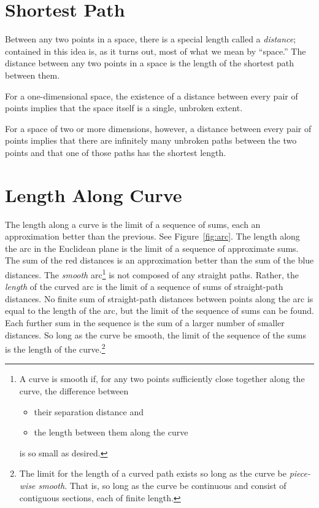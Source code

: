 \section{Shortest Path}

Between any two points in a space, there is a special length called a
\emph{distance}; contained in this idea is, as it turns out, most of what we
mean by ``space.'' The distance between any two points in a space is the length
of the shortest path between them.

For a one-dimensional space, the existence of a distance between every pair of
points implies that the space itself is a single, unbroken extent.

For a space of two or more dimensions, however, a distance between every pair
of points implies that there are infinitely many unbroken paths between the two
points and that one of those paths has the shortest length.

\section{Length Along Curve}

The length along a curve is the limit of a sequence of sums, each an
approximation better than the previous.  See Figure~\ref{fig:arc}.  The length
along the arc in the Euclidean plane is the limit of a sequence of approximate
sums.  The sum of the red distances is an approximation better than the sum of
the blue distances.  The \emph{smooth} arc\footnote{%
   A curve is smooth if, for any two points sufficiently close together along
   the curve, the difference between
   \begin{itemize}[noitemsep]
      \item their separation distance and
      \item the length between them along the curve
   \end{itemize}
   is so small as desired.%
}
is not composed of any straight paths.  Rather, the \emph{length} of the curved
arc is the limit of a sequence of sums of straight-path distances.  No finite
sum of straight-path distances between points along the arc is equal to the
length of the arc, but the limit of the sequence of sums can be found.  Each
further sum in the sequence is the sum of a larger number of smaller distances.
So long as the curve be smooth, the limit of the sequence of the sums is the
length of the curve.\footnote{%
   The limit for the length of a curved path exists so long as the curve be
   \emph{piece-wise smooth}.  That is, so long as the curve be continuous and
   consist of contiguous sections, each of finite length.%
}

